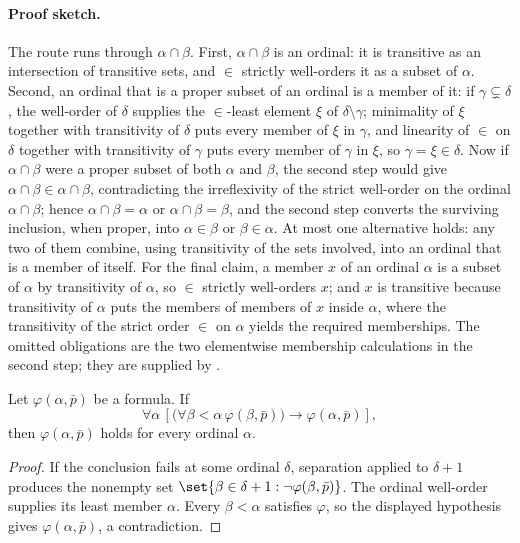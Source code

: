 \paragraph{Proof sketch.}
The route runs through \(\alpha\cap\beta\).  First, \(\alpha\cap\beta\) is an
ordinal: it is transitive as an intersection of transitive sets, and \(\in\)
strictly well-orders it as a subset of \(\alpha\).  Second, an ordinal that
is a proper subset of an ordinal is a member of it: if
\(\gamma\subsetneq\delta\), the well-order of \(\delta\) supplies the
\(\in\)-least element \(\xi\) of \(\delta\setminus\gamma\); minimality of
\(\xi\) together with transitivity of \(\delta\) puts every member of
\(\xi\) in \(\gamma\), and linearity of \(\in\) on \(\delta\) together with
transitivity of \(\gamma\) puts every member of \(\gamma\) in \(\xi\), so
\(\gamma=\xi\in\delta\).  Now if \(\alpha\cap\beta\) were a proper subset of
both \(\alpha\) and \(\beta\), the second step would give
\(\alpha\cap\beta\in\alpha\cap\beta\), contradicting the irreflexivity of
the strict well-order on the ordinal \(\alpha\cap\beta\); hence
\(\alpha\cap\beta=\alpha\) or \(\alpha\cap\beta=\beta\), and the second step
converts the surviving inclusion, when proper, into \(\alpha\in\beta\) or
\(\beta\in\alpha\).  At most one alternative holds: any two of them combine,
using transitivity of the sets involved, into an ordinal that is a member of
itself.  For the final claim, a member \(x\) of an ordinal \(\alpha\) is a
subset of \(\alpha\) by transitivity of \(\alpha\), so \(\in\) strictly
well-orders \(x\); and \(x\) is transitive because transitivity of
\(\alpha\) puts the members of members of \(x\) inside \(\alpha\), where the
transitivity of the strict order \(\in\) on \(\alpha\) yields the required
memberships.  The omitted obligations are the two elementwise membership
calculations in the second step; they are supplied by \cite{Jech2003}.

\begin{theorem}
Let \(\varphi(\alpha,\bar p)\) be a formula.  If
\[
  \forall\alpha\,
  \left[
    \bigl(\forall\beta<\alpha\,\varphi(\beta,\bar p)\bigr)
    \to\varphi(\alpha,\bar p)
  \right],
\]
then \(\varphi(\alpha,\bar p)\) holds for every ordinal \(\alpha\).
\end{theorem}

\begin{proof}
If the conclusion fails at some ordinal \(\delta\), separation applied to
\(\delta+1\) produces the nonempty set
\(\set{\beta\in\delta+1:\neg\varphi(\beta,\bar p)}\).  The ordinal
well-order supplies its least member \(\alpha\).  Every \(\beta<\alpha\) satisfies \(\varphi\), so
the displayed hypothesis gives \(\varphi(\alpha,\bar p)\), a contradiction.
\end{proof}

